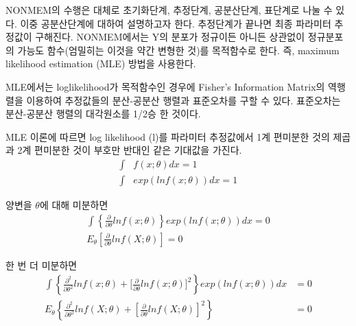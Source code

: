 \documentclass[
  11pt,
  krantz2, a4paper, twoside]{krantz}
\theoremstyle{definition}
\theoremstyle{definition}
\theoremstyle{definition}
\theoremstyle{remark}
\begin{document}

NONMEM의 수행은 대체로 초기화단계, 추정단계, 공분산단계, 표단계로 나눌 수 있다. 이중 공분산단계에 대하여 설명하고자 한다. 추정단계가 끝나면 최종 파라미터 추정값이 구해진다. NONMEM에서는 Y의 분포가 정규이든 아니든 상관없이 정규분포의 가능도 함수(엄밀히는 이것을 약간 변형한 것)를 목적함수로 한다. 즉, maximum likelihood estimation (MLE) 방법을 사용한다.

MLE에서는 loglikelihood가 목적함수인 경우에 Fisher's Information Matrix의 역행렬을 이용하여 추정값들의 분산-공분산 행렬과 표준오차를 구할 수 있다. 표준오차는 분산-공분산 행렬의 대각원소를 1/2승 한 것이다.

MLE 이론에 따르면 log likelihood (l)를 파라미터 추정값에서 1계 편미분한 것의 제곱과 2계 편미분한 것이 부호만 반대인 같은 기대값을 가진다.
\begin{equation}
\begin{split}
  \int & f(x;\theta)dx = 1 \\
  \int & exp(lnf(x;\theta))dx = 1
\end{split}
\label{eq:mle-theory}
\end{equation}

양변을 \(\theta\)에 대해 미분하면
\begin{equation}
\begin{split}
\int\left\{ \frac{\partial}{\partial\theta}lnf(x;\theta) \right\} exp(lnf(x;\theta))dx = 0 \\
E_{\theta}\left\lbrack \frac{\partial}{\partial\theta}lnf(X;\theta) \right\rbrack = 0
\end{split}
\label{eq:theta-differential}
\end{equation}

한 번 더 미분하면
\begin{equation}
\begin{split}
\int \left\{\frac{\partial^{2}}{\partial\theta^{2}}lnf(x;\theta) + \lbrack \frac{\partial}{\partial\theta}lnf(x;\theta) \rbrack^{2} \right\} exp(lnf(x;\theta))dx &= 0 \\
E_{\theta}\left\{ \frac{\partial^{2}}{\partial\theta^{2}}lnf(X;\theta) + \left\lbrack \frac{\partial}{\partial\theta}lnf(X;\theta) \right\rbrack^{2} \right\} &= 0
\end{split}
\label{eq:diff-diff}
\end{equation}
\end{document}
